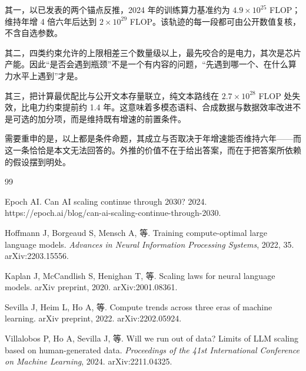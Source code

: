 \documentclass[11pt,a4paper]{article}
\begin{document}
其一，以已发表的两个锚点反推，2024 年的训练算力基准约为 $4.9\times10^{25}$ FLOP；维持年增 4 倍六年后达到 $2\times10^{29}$ FLOP。该轨迹的每一段都可由公开数值复核，不含自选参数。

其二，四类约束允许的上限相差三个数量级以上，最先咬合的是电力，其次是芯片产能。因此“是否会遇到瓶颈”不是一个有内容的问题，“先遇到哪一个、在什么算力水平上遇到”才是。

其三，把计算最优配比与公开文本存量联立，纯文本路线在 $2.7\times10^{28}$ FLOP 处失效，比电力约束提前约 1.4 年。这意味着多模态语料、合成数据与数据效率改进不是可选的加分项，而是维持既有增速的前置条件。

需要重申的是，以上都是条件命题，其成立与否取决于年增速能否维持六年——而这一条恰恰是本文无法回答的。外推的价值不在于给出答案，而在于把答案所依赖的假设摆到明处。

\begin{thebibliography}{99}

Epoch AI. Can AI scaling continue through 2030? 2024.
\newblock https://epoch.ai/blog/can-ai-scaling-continue-through-2030.

Hoffmann J, Borgeaud S, Mensch A, 等. Training compute-optimal large language models.
\newblock \emph{Advances in Neural Information Processing Systems}, 2022, 35. arXiv:2203.15556.

Kaplan J, McCandlish S, Henighan T, 等. Scaling laws for neural language models.
\newblock arXiv preprint, 2020. arXiv:2001.08361.

Sevilla J, Heim L, Ho A, 等. Compute trends across three eras of machine learning.
\newblock arXiv preprint, 2022. arXiv:2202.05924.

Villalobos P, Ho A, Sevilla J, 等. Will we run out of data? Limits of LLM scaling based on
human-generated data.
\newblock \emph{Proceedings of the 41st International Conference on Machine Learning}, 2024.
arXiv:2211.04325.

\end{thebibliography}
\end{document}
